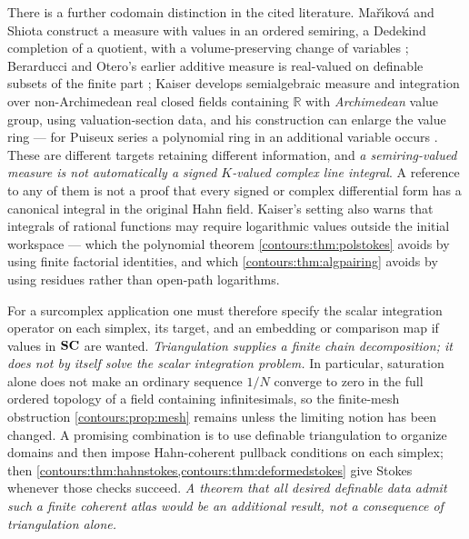 \documentclass[11pt,letterpaper]{article}
\theoremstyle{definition}
\theoremstyle{remark}
\newcommand{\R}{\mathbb R}\newcommand{\C}{\mathbb C}\newcommand{\Q}{\mathbb Q}
\numberwithin{equation}{section}
\begin{document}
There is a further codomain distinction in the cited literature.
Ma\v r\'{\i}kov\'a and Shiota construct a measure with values in an ordered
semiring, a Dedekind completion of a quotient, with a volume-preserving change of
variables \cite{MS}; Berarducci and Otero's earlier additive measure is real-valued
on definable subsets of the finite part \cite{BOmeasure}; Kaiser develops
semialgebraic measure and integration over non-Archimedean real closed fields
containing $\R$ with \emph{Archimedean} value group, using valuation-section data,
and his construction can enlarge the value ring --- for Puiseux series a polynomial
ring in an additional variable occurs \cite{Kaiser}. These are different targets
retaining different information, and \emph{a semiring-valued measure is not
automatically a signed $K$-valued complex line integral}. A reference to any of them
is not a proof that every signed or complex differential form has a canonical
integral in the original Hahn field. Kaiser's setting also warns that integrals of
rational functions may require logarithmic values outside the initial workspace ---
which the polynomial theorem \cref{contours:thm:polstokes} avoids by using finite
factorial identities, and which \cref{contours:thm:algpairing} avoids by using
residues rather than open-path logarithms.

For a surcomplex application one must therefore specify the scalar integration
operator on each simplex, its target, and an embedding or comparison map if values
in $\mathbf{SC}$ are wanted. \emph{Triangulation supplies a finite chain decomposition; it
does not by itself solve the scalar integration problem.} In particular, saturation
alone does not make an ordinary sequence $1/N$ converge to zero in the full ordered
topology of a field containing infinitesimals, so the finite-mesh obstruction
\cref{contours:prop:mesh} remains unless the limiting notion has been changed. A
promising combination is to use definable triangulation to organize domains and then
impose Hahn-coherent pullback conditions on each simplex; then
\cref{contours:thm:hahnstokes,contours:thm:deformedstokes} give Stokes whenever
those checks succeed. \emph{A theorem that all desired definable data admit such a
finite coherent atlas would be an additional result, not a consequence of
triangulation alone.}
\end{document}
